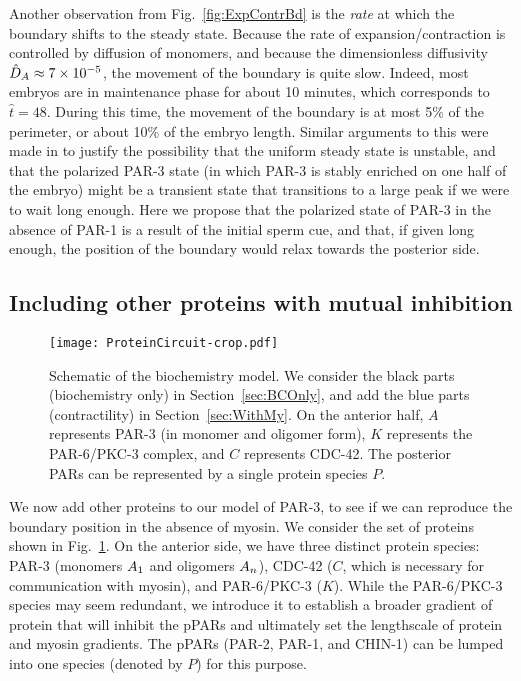 \documentclass[11pt]{article}
\newcommand{\6}[1]{#1_{\text{6}}}
\newcommand{\3}[1]{#1_{\text{3}}}
\begin{document}
Another observation from Fig.\ \ref{fig:ExpContrBd} is the \emph{rate} at which the boundary shifts to the steady state. Because the rate of expansion/contraction is controlled by diffusion of monomers, and because the dimensionless diffusivity $\hat{D}_A \approx 7 \times 10^{-5}$,  the movement of the boundary is quite slow. Indeed, most embryos are in maintenance phase for about 10 minutes, which corresponds to $\hat t = 48$. During this time, the movement of the boundary is at most 5\% of the perimeter, or about 10\% of the embryo length. Similar arguments to this were made in \cite{lang2022oligomerization} to justify the possibility that the uniform steady state is unstable, and that the polarized PAR-3 state (in which PAR-3 is stably enriched on one half of the embryo) \cite{lang2023oligomerization} might be a transient state that transitions to a large peak if we were to wait long enough. Here we propose that the polarized state of PAR-3 in the absence of PAR-1 is a result of the initial sperm cue, and that, if given long enough, the position of the boundary would relax towards the posterior side.

\subsection{Including other proteins with mutual inhibition \label{sec:BCOnly}}
\begin{figure}
\centering
\texttt{[image: ProteinCircuit-crop.pdf]}
\caption{\label{fig:ModelSch}Schematic of the biochemistry model. We consider the black parts (biochemistry only) in Section\ \ref{sec:BCOnly}, and add the blue parts (contractility) in Section\ \ref{sec:WithMy}. On the anterior half, $A$ represents PAR-3 (in monomer and oligomer form), $K$ represents the PAR-6/PKC-3 complex, and $C$ represents CDC-42. The posterior PARs can be represented by a single protein species $P$.}
\end{figure}

We now add other proteins to our model of PAR-3, to see if we can reproduce the boundary position in the absence of myosin. We consider the set of proteins shown in Fig.\ \ref{fig:ModelSch}. On the anterior side, we have three distinct protein species: PAR-3 (monomers $A_1$ and oligomers $A_n$), CDC-42 ($C$, which is necessary for communication with myosin), and PAR-6/PKC-3 ($K$). While the PAR-6/PKC-3 species may seem redundant, we introduce it to establish a broader gradient of protein that will inhibit the pPARs and ultimately set the lengthscale of protein and myosin gradients. The pPARs (PAR-2, PAR-1, and CHIN-1) can be lumped into one species (denoted by $P$) for this purpose.
\end{document}
